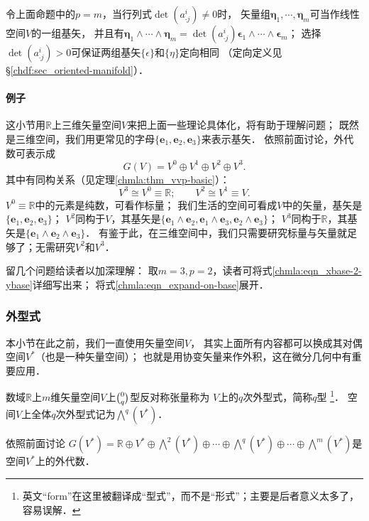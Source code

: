 \begin{remark}\label{chmla:rmk_b2b}
令上面命题中的$p=m$，当行列式$\det(a^{i}_{\cdot j}) \neq 0$时，
矢量组$\boldsymbol{\eta}_1,\cdots,\boldsymbol{\eta}_m$可当作线性空间$V$的一组基矢，
并且有$\boldsymbol{\eta}_{1} \wedge \cdots \wedge \boldsymbol{\eta}_{m}
=\det(a^{i}_{\cdot j})
\boldsymbol{\epsilon}_{1} \wedge \cdots \wedge\boldsymbol{\epsilon}_{m}$；
选择$\det(a^{i}_{\cdot j}) > 0$可保证两组基矢$\{\epsilon\}$和$\{\eta\}$定向相同
（定向定义见\S \ref{chdf:sec_oriented-manifold}）．
\end{remark}

\paragraph{例子}
这小节用$\mathbb{R}$上三维矢量空间$V$来把上面一些理论具体化，将有助于理解问题；
既然是三维空间，我们用更常见的字母$\{\boldsymbol{e}_1,\boldsymbol{e}_2,\boldsymbol{e}_3\}$来表示基矢．
依照前面讨论，外代数可表示成
\begin{equation}
    G(V)= V^0 \oplus V^1 \oplus V^2 \oplus V^3 .
\end{equation}
其中有同构关系（见定理\ref{chmla:thm_vvp-basic}）：
\begin{equation}
    V^3\cong V^0 \equiv \mathbb{R} ; \qquad  V^2 \cong V^1  \equiv V .
\end{equation}
$V^0 \equiv \mathbb{R}$中的元素是纯数，可看作标量；
我们生活的空间可看成$V$中的矢量，基矢是$\{\boldsymbol{e}_1,\boldsymbol{e}_2,\boldsymbol{e}_3\}$；
$V^2$同构于$V$，其基矢是$\{\boldsymbol{e}_1\wedge \boldsymbol{e}_2,\boldsymbol{e}_1\wedge\boldsymbol{e}_3
,\boldsymbol{e}_2\wedge \boldsymbol{e}_3\}$；
$V^3$同构于$\mathbb{R}$，其基矢是$\{\boldsymbol{e}_1\wedge\boldsymbol{e}_2\wedge\boldsymbol{e}_3\}$．
有鉴于此，在三维空间中，我们只需要研究标量与矢量就足够了；无需研究$V^2$和$V^3$．

留几个问题给读者以加深理解：
取$m=3,p=2$，读者可将式\eqref{chmla:eqn_xbase-2-ybase}详细写出来；
将式\eqref{chmla:eqn_expand-on-base}展开．

\subsubsection{外型式}\label{chmla:sec_exterior-form}
本小节在此之前，我们一直使用矢量空间$V$，
其实上面所有内容都可以换成其对偶空间$V^*$（也是一种矢量空间）；
也就是用协变矢量来作外积，这在微分几何中有重要应用．
\begin{definition}\label{chmla:def_exterior-form}
    数域$\mathbb{R}$上$m$维矢量空间$V$上$\binom{0}{q}$型{\kaishu 反对称}张量称为
    $V$上的$q$次{\heiti 外型式}，简称$q${\heiti 型}
    {\footnote{英文“form”在这里被翻译成“型式”，而不是“形式”；主要是后者意义太多了，容易误解．}}．
    空间$V$上全体$q$次外型式记为$\bigwedge^q (V^*)$．
\end{definition}
依照前面讨论
$G(V^*)=\mathbb{R} \oplus V^* \oplus \bigwedge^2 (V^*) \oplus  \cdots
  \oplus \bigwedge^q (V^*)\oplus \cdots \oplus \bigwedge^m (V^*) $是
空间$V^*$上的外代数．

